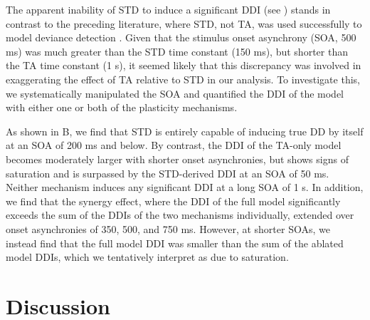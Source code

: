 \documentclass[9pt,lineno,onehalfspacing]{elife}
\begin{document}
The apparent inability of STD to induce a significant DDI (see ) stands in contrast to the preceding literature, where STD, not TA, was used successfully to model deviance detection \citep{Mill2011-ah, May2015-lt, Yarden2017-eh}. Given that the stimulus onset asynchrony (SOA, 500 ms) was much greater than the STD time constant (150 ms), but shorter than the TA time constant (1 s), it seemed likely that this discrepancy was involved in exaggerating the effect of TA relative to STD in our analysis. To investigate this, we systematically manipulated the SOA and quantified the DDI of the model with either one or both of the plasticity mechanisms.

As shown in B, we find that STD is entirely capable of inducing true DD by itself at an SOA of 200 ms and below. By contrast, the DDI of the TA-only model becomes moderately larger with shorter onset asynchronies, but shows signs of saturation and is surpassed by the STD-derived DDI at an SOA of 50 ms. Neither mechanism induces any significant DDI at a long SOA of 1 s. In addition, we find that the synergy effect, where the DDI of the full model significantly exceeds the sum of the DDIs of the two mechanisms individually, extended over onset asynchronies of 350, 500, and 750 ms. However, at shorter SOAs, we instead find that the full model DDI was smaller than the sum of the ablated model DDIs, which we tentatively interpret as due to saturation.

\section{Discussion}\label{sec:discussion}
\end{document}
